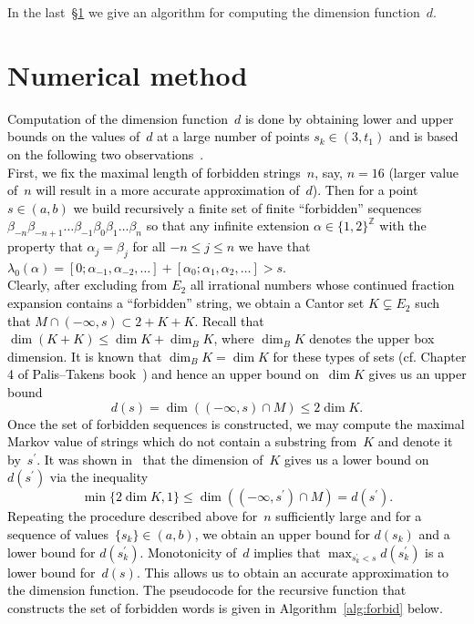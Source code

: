\documentclass[10pt]{amsart}
\numberwithin{equation}{section}
\theoremstyle{definition}
\newcommand\pvlong[1]{\textcolor{black}{#1} }
\begin{document}
In the last~\S\ref{s.approx} we give an algorithm for computing the dimension
function~$d$. %


\section{Numerical method}
\label{s.approx}
\pvlong{Computation of the dimension function~$d$ is done by obtaining lower and upper
bounds on the values of~$d$ at a large number of points $s_k \in (3, t_1)$ and
is based on the following two observations~\cite[\S2.1]{MMPV}. 
\\
\indent First, we fix the maximal length of forbidden strings~$n$, say, $n=16$ (larger
value of~$n$ will result in a more accurate approximation of~$d$). 
Then for a point $s \in (a,b)$ we build recursively a finite set of finite
``forbidden'' sequences $\beta_{-n} \beta_{-n+1} \ldots \beta_{-1} \beta_0
\beta_1 \ldots \beta_n$ so that any infinite extension $\alpha \in \{1,
2\}^{\mathbb  Z} $ with the property that $\alpha_j = \beta_j$ for all  $-n \le j
\le n$ we have that  
$
\lambda_0(\alpha) = [0; \alpha_{-1}, \alpha_{-2}, \ldots] + [\alpha_0; \alpha_1, \alpha_2, \ldots] > s.
$
\\
\indent Clearly, after excluding from $E_2$ all irrational numbers whose continued 
fraction expansion contains a ``forbidden'' string, we obtain a Cantor set $K
\subsetneq E_2$ such that $M \cap (-\infty, s) \subset 2 + K + K$.
Recall that $\dim (K + K) \le \dim K + \dim_B K$, where $\dim_B K$ denotes the upper box dimension.
It is known that $\dim_B K = \dim K$ for these types of sets (cf. Chapter 4 of
Palis--Takens book~\cite{PT}) and hence an upper bound on~$\dim K$ gives us an
upper bound 
$$
d(s) = \dim((-\infty,s) \cap M  ) \le 2\dim K.
$$
Once the set of forbidden sequences is constructed, we may compute the maximal 
Markov value of strings which do not contain a substring from~$K$ and denote it
by~$s^\prime$.
It was shown in~\cite[proof of Lemma~3]{Mor18} that the dimension of~$K$ gives us a lower
bound on $d(s^\prime)$ via the inequality
$$
\min\{2 \dim K, 1\} \le \dim (( -\infty, s^\prime) \cap M ) = d(s^\prime) . 
$$
Repeating the procedure described above for~$n$ sufficiently large and for a
sequence of values~$\{s_k\} \in (a,b) $, we obtain an
upper bound for $d(s_k)$ and a lower bound for $d(s_k^\prime)$. Monotonicity
of~$d$ implies that $\max_{s_k^\prime < s} d(s_k^\prime)$ is a lower bound
for~$d(s)$. This allows us to obtain an accurate approximation to the
dimension function. The pseudocode for the recursive function that constructs the set of forbidden
words is given in Algorithm~\ref{alg:forbid} below.}
\end{document}
